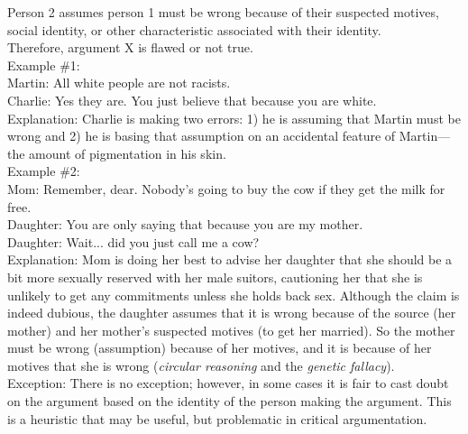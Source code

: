 \documentclass[a4paper,12pt,single,pdftex]{scrartcl}
\begin{document}
    
      Person 2 assumes person 1 must be wrong because of their suspected motives, social identity, or other characteristic associated with their identity.
    \\

    
      Therefore, argument X is flawed or not true.
    \\

    
      Example \#1:
    \\

    
      Martin: All white people are not racists.
    \\

    
      Charlie: Yes they are. You just believe that because you are white.
    \\

    
      Explanation: Charlie is making two errors: 1) he is assuming that Martin must be wrong and 2) he is basing that assumption on an accidental feature of Martin—the amount of pigmentation in his skin.
    \\

    
      Example \#2:
    \\

    
      Mom: Remember, dear. Nobody's going to buy the cow if they get the milk for free.
    \\

    
      Daughter: You are only saying that because you are my mother.
    \\

    
      Daughter: Wait... did you just call me a cow?
    \\

    
      Explanation: Mom is doing her best to advise her daughter that she should be a bit more sexually reserved with her male suitors, cautioning her that she is unlikely to get any commitments unless she holds back sex. Although the claim is indeed dubious, the daughter assumes that it is wrong because of the source (her mother) and her mother's suspected motives (to get her married). So the mother must be wrong (assumption) because of her motives, and it is because of her motives that she is wrong ({\it circular reasoning} and the {\it genetic fallacy}).
    \\

    
      Exception: There is no exception; however, in some cases it is fair to cast doubt on the argument based on the identity of the person making the argument. This is a heuristic that may be useful, but problematic in critical argumentation.
    \\
\end{document}

